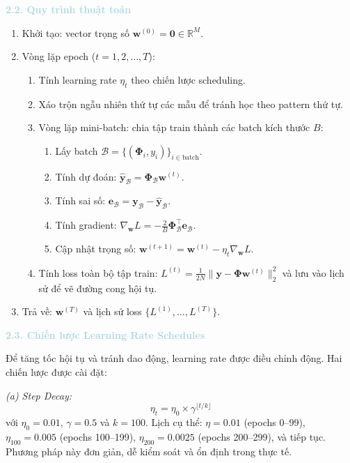\noindent\textcolor{lightblue}{\textbf{2.2. Quy trình thuật toán}}
\begin{enumerate}
    \item Khởi tạo: vector trọng số $\mathbf{w}^{(0)} = \mathbf{0} \in \mathbb{R}^{M}$.

    \item Vòng lặp epoch ($t = 1, 2, \ldots, T$):
    \begin{enumerate}
        \item Tính learning rate $\eta_t$ theo chiến lược scheduling.
        \item Xáo trộn ngẫu nhiên thứ tự các mẫu để tránh học theo pattern thứ tự.
        \item Vòng lặp mini-batch: chia tập train thành các batch kích thước $B$:
        \begin{enumerate}
            \item Lấy batch $\mathcal{B} = \{(\boldsymbol{\Phi}_i, y_i)\}_{i \in \text{batch}}$.
            \item Tính dự đoán: $\hat{\mathbf{y}}_{\mathcal{B}} = \boldsymbol{\Phi}_{\mathcal{B}} \mathbf{w}^{(t)}$.
            \item Tính sai số: $\mathbf{e}_{\mathcal{B}} = \mathbf{y}_{\mathcal{B}} - \hat{\mathbf{y}}_{\mathcal{B}}$.
            \item Tính gradient: $\nabla_{\mathbf{w}} L = -\frac{2}{B} \boldsymbol{\Phi}_{\mathcal{B}}^{\top} \mathbf{e}_{\mathcal{B}}$.
            \item Cập nhật trọng số: $\mathbf{w}^{(t+1)} = \mathbf{w}^{(t)} - \eta_t \nabla_{\mathbf{w}} L$.
        \end{enumerate}
        \item Tính loss toàn bộ tập train: $L^{(t)} = \frac{1}{2N}\|\mathbf{y} - \boldsymbol{\Phi}\mathbf{w}^{(t)}\|^2_2$ và lưu vào lịch sử để vẽ đường cong hội tụ.
    \end{enumerate}

    \item Trả về: $\mathbf{w}^{(T)}$ và lịch sử loss $\{L^{(1)}, \ldots, L^{(T)}\}$.
\end{enumerate}

\noindent\textcolor{lightblue}{\textbf{2.3. Chiến lược Learning Rate Schedules}}

Để tăng tốc hội tụ và tránh dao động, learning rate được điều chỉnh động. Hai chiến lược được cài đặt:

\textit{(a) Step Decay:}
\begin{equation}
    \eta_t = \eta_0 \times \gamma^{\lfloor t / k \rfloor}
\end{equation}
với $\eta_0 = 0.01$, $\gamma = 0.5$ và $k = 100$. Lịch cụ thể: $\eta = 0.01$ (epochs 0--99), $\eta_{100} = 0.005$ (epochs 100--199), $\eta_{200} = 0.0025$ (epochs 200--299), và tiếp tục. Phương pháp này đơn giản, dễ kiểm soát và ổn định trong thực tế.

